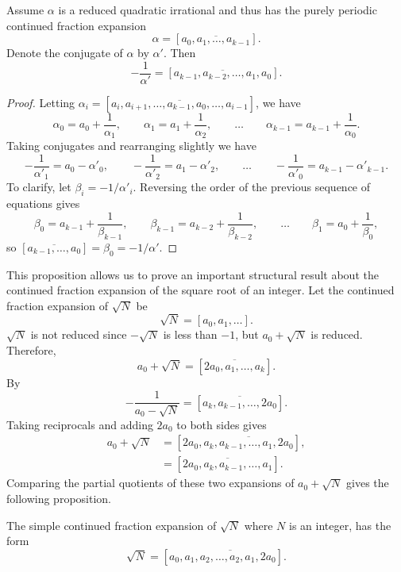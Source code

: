 \begin{proposition}[Galois] \label{CF:Galois:Rev:Prop}
Assume $\alpha$ is a reduced quadratic irrational and thus has the
purely periodic continued fraction expansion
\[
\alpha = [\overline{a_0, a_1, \ldots, a_{k-1}}].
\]
Denote the conjugate of $\alpha$ by $\alpha'$.  Then
\[
-\frac{1}{\alpha'} = [\overline{a_{k-1}, a_{k-2}, \ldots, a_1, a_0}].
\]
\end{proposition}

\begin{proof}
Letting $\alpha_i = [\overline{a_i, a_{i+1}, \ldots, a_{k-1}, a_0,
\ldots, a_{i-1}}]$, we have
\[
\alpha_0 = a_0 + \frac{1}{\alpha_1}, \qquad
\alpha_1 = a_1 + \frac{1}{\alpha_2}, \qquad \ldots \qquad
\alpha_{k-1} = a_{k-1} + \frac{1}{\alpha_0}.
\]
Taking conjugates and rearranging slightly we have
\[
-\frac{1}{\alpha'_1} = a_0 - \alpha'_0, \qquad
-\frac{1}{\alpha'_2} = a_1 - \alpha'_2, \qquad \ldots \qquad
-\frac{1}{\alpha'_0} = a_{k-1} - \alpha'_{k-1}.
\]
To clarify, let $\beta_i = -1/\alpha'_i$.  Reversing the order of the
previous sequence of equations gives
\[
\beta_0 = a_{k-1} + \frac{1}{\beta_{k-1}}, \qquad
\beta_{k-1} = a_{k-2} + \frac{1}{\beta_{k-2}}, \qquad\ldots \qquad
\beta_1 = a_0 + \frac{1}{\beta_{0}},
\]
so $[\overline{a_{k-1}, \ldots, a_{0}}] = \beta_0 = -1/\alpha'$.
\end{proof}

This proposition allows us to prove an important structural result
about the continued fraction expansion of the square root of an
integer. Let the continued fraction expansion of $\sqrt{N}$ be
\[
\sqrt{N} = [a_0, a_1, \ldots ].
\]
$\sqrt{N}$ is not reduced since $-\sqrt{N}$ is less than $-1$, but
$a_0 + \sqrt{N}$ is reduced.  Therefore, 
\[
a_0 + \sqrt{N} = [\overline{2a_0, a_1, \ldots, a_k}].
\]
By 
\[
-\frac{1}{a_0 - \sqrt{N}} = [\overline{a_k, a_{k-1}, \ldots, 2a_0}].
\]
Taking reciprocals and adding $2a_0$ to both sides gives
\[
\begin{aligned}
a_0 + \sqrt{N} & = [2a_0, \overline{a_k, a_{k-1}, \ldots, a_1, 2a_0}],\\
& = [\overline{2a_0, a_k, a_{k-1}, \ldots, a_1}].
\end{aligned}
\]
Comparing the partial quotients of these two expansions of
$a_0+\sqrt{N}$ gives the following proposition.

\begin{proposition} \label{CF:Sqrt:Form:Prop}
The simple continued fraction expansion of $\sqrt{N}$ where $N$ is an
integer, has the form
\[
\sqrt{N} = [a_0, \overline{a_1, a_2, \ldots, a_2, a_1, 2 a_0}].
\]
\end{proposition}

